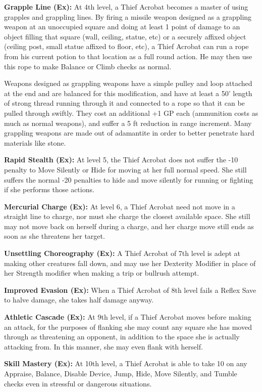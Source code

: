 \textbf{Grapple Line (Ex):} At 4th level, a Thief Acrobat becomes a master of using grapples and grappling lines. By firing a missile weapon designed as a grappling weapon at an unoccupied square and doing at least 1 point of damage to an object filling that square (wall, ceiling, statue, etc) or a securely affixed object (ceiling post, small statue affixed to floor, etc), a Thief Acrobat can run a rope from his current potion to that location as a full round action. He may then use this rope to make Balance or Climb checks as normal.

Weapons designed as grappling weapons have a simple pulley and loop attached at the end and are balanced for this modification, and have at least a 50' length of strong thread running through it and connected to a rope so that it can be pulled through swiftly. They cost an additional +1 GP each (ammunition costs as much as normal weapons), and suffer a 5 ft reduction in range increment. Many grappling weapons are made out of adamantite in order to better penetrate hard materials like stone.

\textbf{Rapid Stealth (Ex):} At level 5, the Thief Acrobat does not suffer the -10 penalty to Move Silently or Hide for moving at her full normal speed. She still suffers the normal -20 penalties to hide and move silently for running or fighting if she performs those actions.

\textbf{Mercurial Charge (Ex):} At level 6, a Thief Acrobat need not move in a straight line to charge, nor must she charge the closest available space. She still may not move back on herself during a charge, and her charge move still ends as soon as she threatens her target.

\textbf{Unsettling Choreography (Ex):} A Thief Acrobat of 7th level is adept at making other creatures fall down, and may use her Dexterity Modifier in place of her Strength modifier when making a trip or bullrush attempt.

\textbf{Improved Evasion (Ex):} When a Thief Acrobat of 8th level fails a Reflex Save to halve damage, she takes half damage anyway.

\textbf{Athletic Cascade (Ex):} At 9th level, if a Thief Acrobat moves before making an attack, for the purposes of flanking she may count any square she has moved through as threatening an opponent, in addition to the space she is actually attacking from. In this manner, she may even flank with herself.

\textbf{Skill Mastery (Ex):} At 10th level, a Thief Acrobat is able to take 10 on any Appraise, Balance, Disable Device, Jump, Hide, Move Silently, and Tumble checks even in stressful or dangerous situations.

